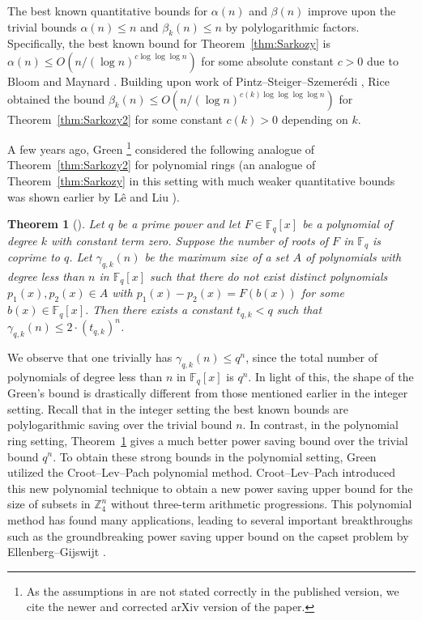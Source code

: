 \documentclass[11pt, reqno]{amsart}
\newtheorem{theorem}{Theorem}[section]
\theoremstyle{definition}
\newcommand{\F}{\mathbb{F}}
\newcommand{\Z}{\mathbb{Z}}
\begin{document}
The best known quantitative bounds for $\alpha(n)$ and $\beta(n)$ improve upon the trivial bounds $\alpha(n) \leq n$ and $\beta_k(n) \leq n$ by polylogarithmic factors. Specifically, the best known bound for Theorem~\ref{thm:Sarkozy} is $\alpha(n) \le O(n/(\log n)^{c \log \log \log n})$ for some absolute constant $c>0$ due to Bloom and Maynard \cite{BM22}. Building upon work of Pintz--Steiger--Szemer\'edi \cite{PSS88}, Rice \cite{R19} obtained the bound $\beta_k(n) \le O(n/(\log n)^{c(k) \log \log \log \log n})$ for Theorem~\ref{thm:Sarkozy2} for some constant $c(k)>0$ depending on $k$.

A few years ago, Green \cite{G17}\footnote{As the assumptions in \cite[Theorem 1.2]{G17} are not stated correctly in the published version, we cite the newer and corrected arXiv version of the paper.} considered the following analogue of Theorem~\ref{thm:Sarkozy2} for polynomial rings (an analogue of Theorem~\ref{thm:Sarkozy} in this setting with much weaker quantitative bounds was shown earlier by L\^{e} and Liu \cite{LL13}).

\begin{theorem}[{\cite[Theorem 1.2]{G17}}]\label{thm:Green-S}
Let $q$ be a prime power and let $F \in \F_q[x]$ be a polynomial of degree $k$ with constant term zero. Suppose the number of roots of $F$ in $\F_q$ is coprime to $q$. Let $\gamma_{q,k}(n)$ be the maximum size of a set $A$ of polynomials with degree less than $n$ in $\F_q[x]$ such that there do not exist distinct polynomials $p_1(x), p_2(x) \in A$ with $p_1(x) - p_2(x) = F(b(x))$ for some $b(x) \in \F_q[x]$. Then there exists a constant $t_{q,k}< q$ such that $\gamma_{q,k}(n)\le 2 \cdot (t_{q,k})^n$.
\end{theorem}

We observe that one trivially has $\gamma_{q,k}(n) \leq q^n$, since the total number of polynomials of degree less than $n$ in $\F_q[x]$ is $q^n$. In light of this, the shape of the Green's bound is drastically different from those mentioned earlier in the integer setting. Recall that in the integer setting the best known bounds are polylogarithmic saving over the trivial bound $n$. In contrast, in the polynomial ring setting, Theorem~\ref{thm:Green-S} gives a much better power saving bound over the trivial bound $q^n$. To obtain these strong bounds in the polynomial setting, Green utilized the Croot--Lev--Pach \cite{CLP17} polynomial method. Croot--Lev--Pach \cite{CLP17} introduced this new polynomial technique to obtain a new power saving upper bound for the size of subsets in $\Z_4^n$ without three-term arithmetic progressions. This polynomial method has found many applications, leading to several important breakthroughs such as the groundbreaking power saving upper bound on the capset problem by Ellenberg--Gijswijt \cite{EG17}. 
\end{document}
